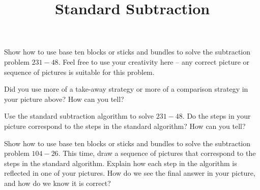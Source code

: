 \documentclass[nooutcomes,noauthor, handout]{ximera}
\title{Standard Subtraction}
\begin{document}
\begin{abstract}
\end{abstract}

\maketitle

\begin{problem}
Show how to use base ten blocks or sticks and bundles to solve the subtraction problem $231 - 48$. Feel free to use your creativity here -- any correct picture or sequence of pictures is suitable for this problem.
\end{problem}


\begin{problem}
Did you use more of a take-away strategy or more of a comparison strategy in your picture above? How can you tell?
\end{problem}


\begin{problem}
Use the standard subtraction algorithm to solve $231 - 48$. Do the steps in your picture correspond to the steps in the standard algorithm? How can you tell?
\end{problem}


\begin{problem}
Show how to use base ten blocks or sticks and bundles to solve the subtraction problem $104 - 26$. This time, draw a sequence of pictures that correspond to the steps in the standard algorithm. Explain how each step in the algorithm is reflected in one of your pictures. How do we see the final answer in your picture, and how do we know it is correct?
\end{problem}



\newpage
\end{document}
